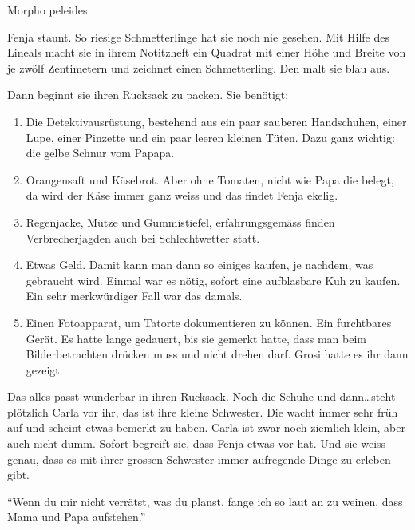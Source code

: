 \begin{description}
	\item[Morpho peleides] 
\end{description}

Fenja staunt. So riesige Schmetterlinge hat sie noch nie gesehen. Mit Hilfe des Lineals macht sie in ihrem Notitzheft ein Quadrat mit einer Höhe und Breite von je zwölf Zentimetern und zeichnet einen Schmetterling. Den malt sie blau aus.

Dann beginnt sie ihren Rucksack zu packen. Sie benötigt:

\begin{enumerate}
  \item Die Detektivausrüstung, bestehend aus ein paar sauberen Handschuhen, einer Lupe, einer Pinzette und ein paar leeren kleinen Tüten. Dazu ganz wichtig: die gelbe Schnur vom Papapa.
  \item Orangensaft und Käsebrot. Aber ohne Tomaten, nicht wie Papa die belegt, da wird der Käse immer ganz weiss und das findet Fenja ekelig.
  \item Regenjacke, Mütze und Gummistiefel, erfahrungsgemäss finden Verbrecherjagden auch bei Schlechtwetter statt.
  \item Etwas Geld. Damit kann man dann so einiges kaufen, je nachdem, was gebraucht wird. Einmal war es nötig, sofort eine aufblasbare Kuh zu kaufen. Ein sehr merkwürdiger Fall war das damals.
  \item Einen Fotoapparat, um Tatorte dokumentieren zu können. Ein furchtbares Gerät. Es hatte lange gedauert, bis sie gemerkt hatte, dass man beim Bilderbetrachten drücken muss und nicht drehen darf. Grosi hatte es ihr dann gezeigt.
\end{enumerate}

Das alles passt wunderbar in ihren Rucksack. Noch die Schuhe und dann\dots steht plötzlich Carla vor ihr, das ist ihre kleine Schwester. Die wacht immer sehr früh auf und scheint etwas bemerkt zu haben. Carla ist zwar noch ziemlich klein, aber auch nicht dumm. Sofort begreift sie, dass Fenja etwas vor hat. Und sie weiss genau, dass es mit ihrer grossen Schwester immer aufregende Dinge zu erleben gibt.

\enquote{Wenn du mir nicht verrätst, was du planst, fange ich so laut an zu weinen, dass Mama und Papa aufstehen.}

